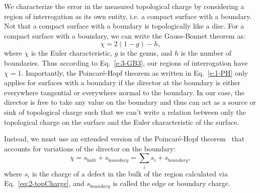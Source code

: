 We characterize the error in the measured topological charge by considering a region of interrogation as its own entity, i.e. a compact surface with a boundary.
Not that a compact surface with a boundary is topologically like a disc.
For a compact surface with a boundary, we can write the Gauss-Bonnet theorem as:
\begin{equation}
  \chi = 2(1-g)-h,\label{e:3-GB3}
\end{equation}
where $\chi$ is the Euler characteristic, $g$ is the genus, and $h$ is the number of boundaries.
Thus according to Eq.~\ref{e:3-GB3}, our regions of interrogation have $\chi = 1$.
Importantly, the Poincar\'e-Hopf theorem as written in Eq.~\ref{e:1-PH} only applies for surfaces with a boundary if the director at the boundary is either everywhere tangential or everywhere normal to the boundary.
In our case, the director is free to take any value on the boundary and thus can act as a source or sink of topological charge such that we can't write a relation between only the topological charge on the surface and the Euler characteristic of the surface.

Instead, we must use an extended version of the Poincar\'e-Hopf theorem~\cite{RN267} that accounts for variations of the director on the boundary:
\begin{equation}
  \chi = s_{bulk} + s_{boundary} = \sum\limits_i s_i + s_{boundary},\label{e:3-extendedPH}
\end{equation}
where $s_i$ is the charge of a defect in the bulk of the region calculated via Eq.~\ref{eq:2-topCharge}, and $s_{boundary}$ is called the edge or boundary charge.


